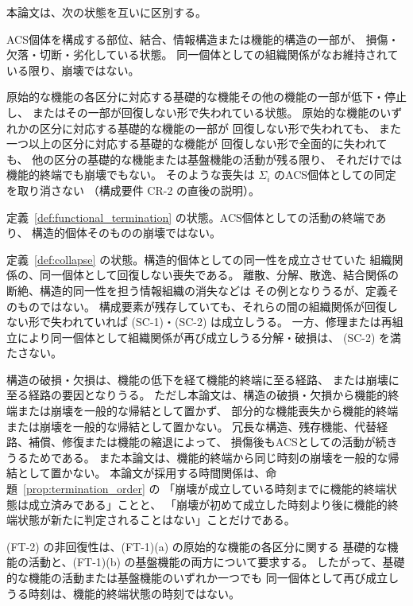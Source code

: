 \begin{remark}
\label{rem:termination_hierarchy}
本論文は、次の状態を互いに区別する。
\begin{description}[style=nextline]
  \item[構造の破損・欠損]
  ACS個体を構成する部位、結合、情報構造または機能的構造の一部が、
  損傷・欠落・切断・劣化している状態。
  同一個体としての組織関係がなお維持されている限り、崩壊ではない。
  \item[部分的な機能不全・機能喪失]
  原始的な機能の各区分に対応する基礎的な機能その他の機能の一部が低下・停止し、
  またはその一部が回復しない形で失われている状態。
  原始的な機能のいずれかの区分に対応する基礎的な機能の一部が
  回復しない形で失われても、
  また一つ以上の区分に対応する基礎的な機能が
  回復しない形で全面的に失われても、
  他の区分の基礎的な機能または基盤機能の活動が残る限り、
  それだけでは機能的終端でも崩壊でもない。
  そのような喪失は $\Sigma_i$ のACS個体としての同定を取り消さない
  （構成要件 CR-2 の直後の説明）。
  \item[機能的終端]
  定義~\ref{def:functional_termination} の状態。ACS個体としての活動の終端であり、
  構造的個体そのものの崩壊ではない。
  \item[崩壊]
  定義~\ref{def:collapse} の状態。構造的個体としての同一性を成立させていた
  組織関係の、同一個体として回復しない喪失である。
  離散、分解、散逸、結合関係の断絶、構造的同一性を担う情報組織の消失などは
  その例となりうるが、定義そのものではない。
  構成要素が残存していても、それらの間の組織関係が回復しない形で失われていれば
  (SC-1)・(SC-2) は成立しうる。
  一方、修理または再組立により同一個体として組織関係が再び成立しうる分解・破損は、
  (SC-2) を満たさない。
\end{description}

構造の破損・欠損は、機能の低下を経て機能的終端に至る経路、
または崩壊に至る経路の要因となりうる。
ただし本論文は、構造の破損・欠損から機能的終端または崩壊を一般的な帰結として置かず、
部分的な機能喪失から機能的終端または崩壊を一般的な帰結として置かない。
冗長な構造、残存機能、代替経路、補償、修復または機能の縮退によって、
損傷後もACSとしての活動が続きうるためである。
また本論文は、機能的終端から同じ時刻の崩壊を一般的な帰結として置かない。
本論文が採用する時間関係は、命題~\ref{prop:termination_order} の
「崩壊が成立している時刻までに機能的終端状態は成立済みである」ことと、
「崩壊が初めて成立した時刻より後に機能的終端状態が新たに判定されることはない」ことだけである。

(FT-2) の非回復性は、(FT-1)(a) の原始的な機能の各区分に関する
基礎的な機能の活動と、(FT-1)(b) の基盤機能の両方について要求する。
したがって、基礎的な機能の活動または基盤機能のいずれか一つでも
同一個体として再び成立しうる時刻は、機能的終端状態の時刻ではない。


\end{remark}
